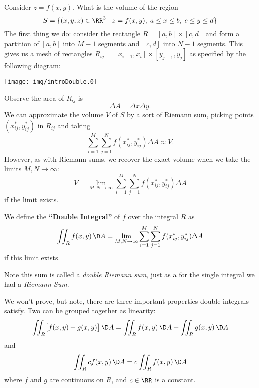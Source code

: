 
\M
Consider $z=f(x,y)$. What is the volume of the region 
\begin{equation}
S = \{ (x,y,z)\in\RR^{3}\mid z=f(x,y),\; a\leq x\leq b,\;
c\leq y\leq d\}
\end{equation}
The first thing we do: consider the rectangle
$R=[a,b]\times[c,d]$ and form a partition of $[a,b]$ into $M-1$
segments and $[c,d]$ into $N-1$ segments. This gives us a mesh of
rectangles $R_{ij} = [x_{i-1},x_{i}]\times[y_{j-1},y_{j}]$ as
specified by the following diagram:
\begin{center}
\texttt{[image: img/introDouble.0]}
\end{center}
Observe the area of $R_{ij}$ is 
\begin{equation}
\Delta A = \Delta x\Delta y.
\end{equation}
We can approximate the volume $V$ of $S$ by a sort of Riemann
sum, picking points $(x_{ij}^{*}, y_{ij}^{*})$ in $R_{ij}$ and
taking
\begin{equation}
\sum^{M}_{i=1}\sum^{N}_{j=1}f(x^{*}_{ij},y^{*}_{ij})\Delta
A\approx V.
\end{equation}
However, as with Riemann sums, we recover the exact volume when
we take the limits $M,N\to\infty$:
\begin{equation}
V = \lim_{M,N\to\infty}\sum^{M}_{i=1}\sum^{N}_{j=1}f(x^{*}_{ij},y^{*}_{ij})\Delta
A
\end{equation}
if the limit exists. \more

We define the \textbf{``Double Integral''} of  $f$ over the integral $R$ as
\begin{equation}
\iint_{R}f(x,y)\,\D A = \lim_{M,N\to\infty}\sum^{M}_{i=1}\sum^{N}_{j=1}f(x^{*}_{ij},y^{*}_{ij})\Delta
A
\end{equation}
if this limit exists. 

Note this sum is called a \emph{double Riemann sum}, just as a
for the single integral we had a \emph{Riemann Sum}.

We won't prove, but note, there are three important properties
double integrals satisfy. Two can be grouped together as
linearity:
\begin{equation}
\iint_{R}\bigl[f(x,y)+g(x,y)\bigr]\,\D A=\iint_{R}f(x,y)\,\D
A+\iint_{R}g(x,y)\,\D A
\end{equation}
and
\begin{equation}
\iint_{R}cf(x,y)\,\D A = c\iint_{R}f(x,y)\,\D A
\end{equation}
where $f$ and $g$ are continuous on $R$, and $c\in\RR$ is a
constant.

